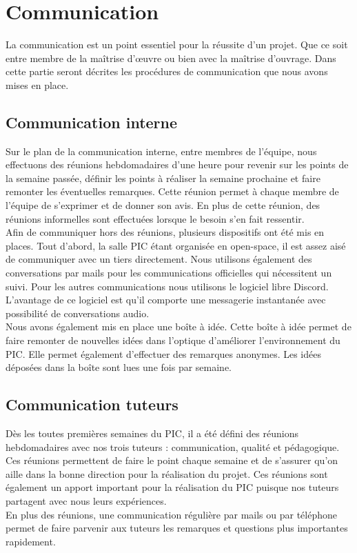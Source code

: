 \documentclass[asi]{picInsa}
\begin{document}
\section{Communication}
La communication est un point essentiel pour la réussite d'un projet. Que ce soit entre membre de la maîtrise d’œuvre ou bien avec la maîtrise d'ouvrage. Dans cette partie seront décrites les procédures de communication que nous avons mises en place.

\subsection{Communication interne}
Sur le plan de la communication interne, entre membres de l'équipe, nous effectuons des réunions hebdomadaires d'une heure pour revenir sur les points de la semaine passée, définir les points à réaliser la semaine prochaine et faire remonter les éventuelles remarques. Cette réunion permet à chaque membre de l'équipe de s'exprimer et de donner son avis. En plus de cette réunion, des réunions informelles sont effectuées lorsque le besoin s'en fait ressentir.\vspace{0.5cm}\\
Afin de communiquer hors des réunions, plusieurs dispositifs ont été mis en places. Tout d'abord, la salle PIC étant organisée en open-space, il est assez aisé de communiquer avec un tiers directement. Nous utilisons également des conversations par mails pour les communications officielles qui nécessitent un suivi. Pour les autres communications nous utilisons le logiciel libre Discord. L'avantage de ce logiciel est qu'il comporte une messagerie instantanée avec possibilité de conversations audio.\vspace{0.5cm}\\
Nous avons également mis en place une boîte à idée. Cette boîte à idée permet de faire remonter de nouvelles idées dans l'optique d'améliorer l'environnement du PIC. Elle permet également d'effectuer des remarques anonymes. Les idées déposées dans la boîte sont lues une fois par semaine.

\subsection{Communication tuteurs}
Dès les toutes premières semaines du PIC, il a été défini des réunions hebdomadaires avec nos trois tuteurs : communication, qualité et pédagogique. Ces réunions permettent de faire le point chaque semaine et de s'assurer qu'on aille dans la bonne direction pour la réalisation du projet. Ces réunions sont également un apport important pour la réalisation du PIC puisque nos tuteurs partagent avec nous leurs expériences.\\
En plus des réunions, une communication régulière par mails ou par téléphone permet de faire parvenir aux tuteurs les remarques et questions plus importantes rapidement.
\end{document}
